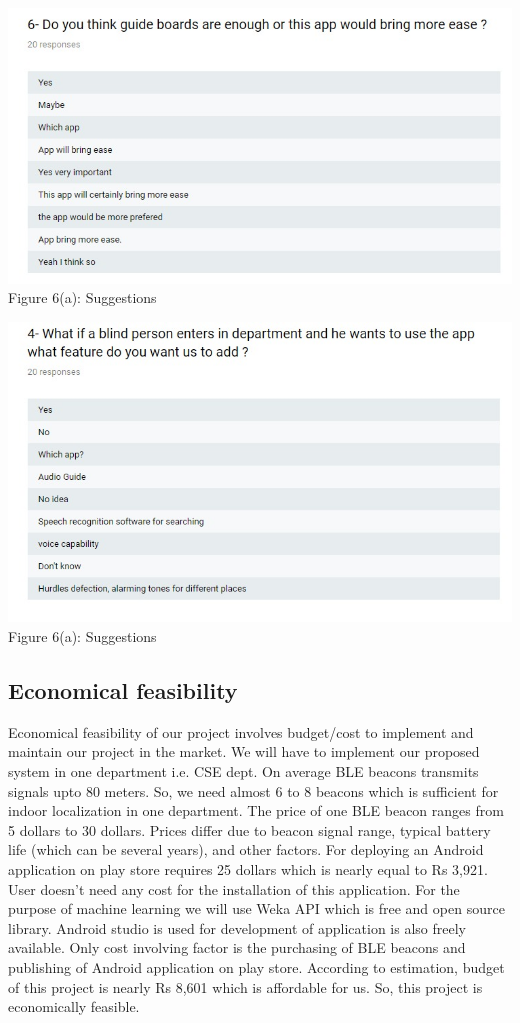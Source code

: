 \documentclass{article}
\begin{document}
 \begin{center}
\includegraphics[scale=0.6]{s1}
\\Figure 6(a): Suggestions
\end{center}
 \begin{center}
\includegraphics[scale=0.6]{s2}
\\Figure 6(a): Suggestions
\end{center}

\subsection{Economical feasibility}

Economical feasibility of our project involves budget/cost to implement and maintain our project in the market. We will have to implement our proposed system in one department i.e. CSE dept. On average BLE beacons transmits signals upto 80 meters. So, we need almost 6 to 8 beacons which is sufficient for indoor localization in one department. The price of one BLE beacon ranges from 5 dollars to 30 dollars. Prices differ due to beacon signal range, typical battery life (which can be several years), and other factors. For deploying an Android application on play store requires 25 dollars which is nearly equal to Rs 3,921. User doesn't need any cost for the installation of this application. For the purpose of machine learning we will use Weka API which is free and open source library. Android studio is used for development of application is also freely available. Only cost
involving factor is the purchasing of BLE beacons\cite{belmonte2017indoor} and publishing of Android application on play store. According to estimation, budget of this project is nearly Rs 8,601 which is affordable for us. So, this project is economically feasible.
\end{document}
